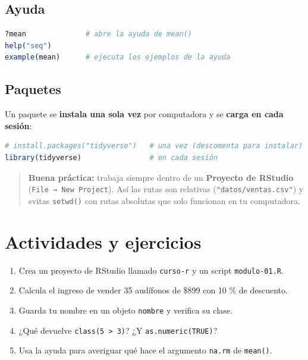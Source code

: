 \subsection{Ayuda}

\begin{lstlisting}[language=R]
?mean              # abre la ayuda de mean()
help("seq")
example(mean)      # ejecuta los ejemplos de la ayuda
\end{lstlisting}

\subsection{Paquetes}

Un paquete se \textbf{instala una sola vez} por computadora y se
\textbf{carga en cada sesión}:

\begin{lstlisting}[language=R]
# install.packages("tidyverse")   # una vez (descomenta para instalar)
library(tidyverse)                # en cada sesión
\end{lstlisting}

\begin{quote}
\textbf{Buena práctica:} trabaja siempre dentro de un \textbf{Proyecto
de RStudio} (\passthrough{\lstinline!File → New Project!}). Así las
rutas son relativas (\passthrough{\lstinline!"datos/ventas.csv"!}) y
evitas \passthrough{\lstinline!setwd()!} con rutas absolutas que solo
funcionan en tu computadora.
\end{quote}

\section{Actividades y ejercicios}

\begin{enumerate}
\def\labelenumi{\arabic{enumi}.}
\tightlist
\item
  Crea un proyecto de RStudio llamado \passthrough{\lstinline!curso-r!}
  y un script \passthrough{\lstinline!modulo-01.R!}.
\item
  Calcula el ingreso de vender 35 audífonos de \$899 con 10 \% de
  descuento.
\item
  Guarda tu nombre en un objeto \passthrough{\lstinline!nombre!} y
  verifica su clase.
\item
  ¿Qué devuelve \passthrough{\lstinline!class(5 > 3)!}? ¿Y
  \passthrough{\lstinline!as.numeric(TRUE)!}?
\item
  Usa la ayuda para averiguar qué hace el argumento
  \passthrough{\lstinline!na.rm!} de \passthrough{\lstinline!mean()!}.
\end{enumerate}

